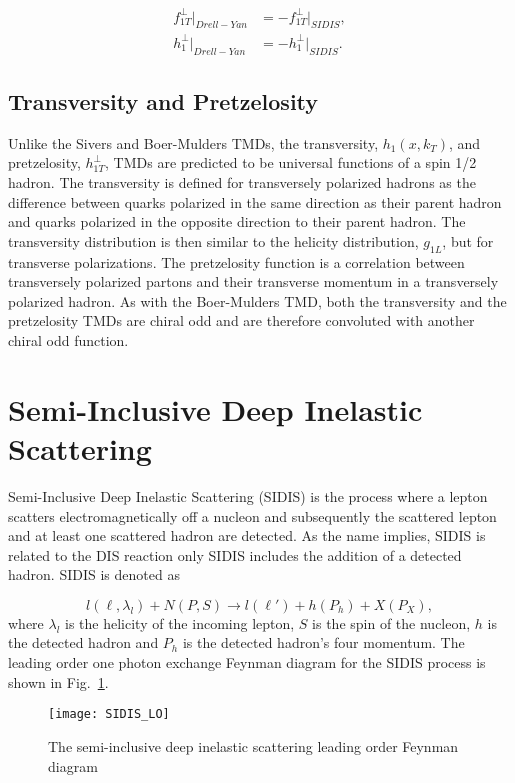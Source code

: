 \begin{align}
  f_{1T}^{\bot} |_{Drell-Yan} &= - f_{1T}^{\bot} |_{SIDIS}, \\
  h_{1}^{\bot} |_{Drell-Yan} &= - h_{1}^{\bot} |_{SIDIS}.
\end{align}

\subsection{Transversity and Pretzelosity}
Unlike the Sivers and Boer-Mulders TMDs, the transversity, $h_1(x, k_T)$, and
pretzelosity, $h_{1T}^{\bot}$, TMDs are predicted to be universal functions of a
spin 1/2 hadron.  The transversity is defined for transversely polarized hadrons
as the difference between quarks polarized in the same direction as their parent
hadron and quarks polarized in the opposite direction to their parent hadron.
The transversity distribution is then similar to the helicity distribution,
$g_{1L}$, but for transverse polarizations.  The pretzelosity function is a
correlation between transversely polarized partons and their transverse momentum
in a transversely polarized hadron.  As with the Boer-Mulders TMD, both the
transversity and the pretzelosity TMDs are chiral odd and are therefore
convoluted with another chiral odd function.


\section{Semi-Inclusive Deep Inelastic Scattering} \label{sec::SIDIS}
Semi-Inclusive Deep Inelastic Scattering (SIDIS) is the process where a lepton
scatters electromagnetically off a nucleon and subsequently the scattered lepton
and at least one scattered hadron are detected.  As the name implies, SIDIS is
related to the DIS reaction only SIDIS includes the addition of a detected
hadron.  SIDIS is denoted as

\begin{equation}
  l(\ell, \lambda_l) + N(P, S) \rightarrow l(\ell') + h(P_h) + X(P_X),
\end{equation}
\noindent
where $\lambda_l$ is the helicity of the incoming lepton, $S$ is the spin of the
nucleon, $h$ is the detected hadron and $P_h$ is the detected hadron's four
momentum.  The leading order one photon exchange Feynman diagram for the SIDIS
process is shown in Fig.~\ref{fig::SIDIS_LO}.

\begin{figure}[h!t]
  \centering
  \texttt{[image: SIDIS\_LO]}
  \caption{The semi-inclusive deep inelastic scattering leading order Feynman
    diagram}
  \label{fig::SIDIS_LO}
\end{figure}

